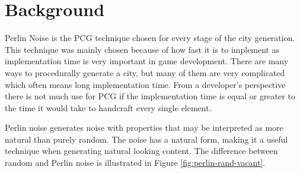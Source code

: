 	\section{Background}
	Perlin Noise is the PCG technique chosen for every stage of the city generation. This technique was mainly chosen because of how fast it is to implement as implementation time is very important in game development.
	There are many ways to procedurally generate a city, but many of them are very complicated which often means long implementation time. From a developer's perspective there is not much use for PCG if the implementation time is equal or greater to the time it would take to handcraft every single element.
	
	Perlin noise generates noise with properties that may be interpreted as more natural than purely random. The noise has a natural form, making it a useful technique when generating natural looking content. The difference between random and Perlin noise is illustrated in Figure \ref{fig:perlin-rand-vacant}.
	
